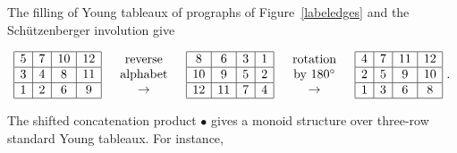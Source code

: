 \documentclass{amsart}
\begin{document}
The filling of Young tableaux of prographs of Figure~\ref{labeledges}
and the Schützenberger involution give

\begin{equation}
  \begin{array}{|c|c|c|c|}\hline
    5 & 7 & 10 & 12 \\ \hline
    3 & 4 & 8 & 11 \\ \hline
    1 & 2 & 6 & 9 \\ \hline
  \end{array}
  \quad
  \begin{array}{c}
    \text{reverse} \\
    \text{alphabet} \\
    \rightarrow
  \end{array}
  \quad
  \begin{array}{|c|c|c|c|}\hline
    8 & 6 & 3 & 1 \\ \hline
    10 & 9 & 5 & 2 \\ \hline
    12 & 11 & 7 & 4 \\ \hline
  \end{array}
  \quad
  \begin{array}{c}
    \text{rotation} \\
    \text{by } 180^{\circ} \\
    \rightarrow
  \end{array}
  \quad
  \begin{array}{|c|c|c|c|}\hline
    4 & 7 & 11 & 12 \\ \hline
    2 & 5 & 9 & 10 \\ \hline
    1 & 3 & 6 & 8 \\ \hline
  \end{array}~.
\end{equation}


The shifted concatenation product $\bullet$ gives a monoid structure
over three-row standard Young tableaux. For instance,
\end{document}
